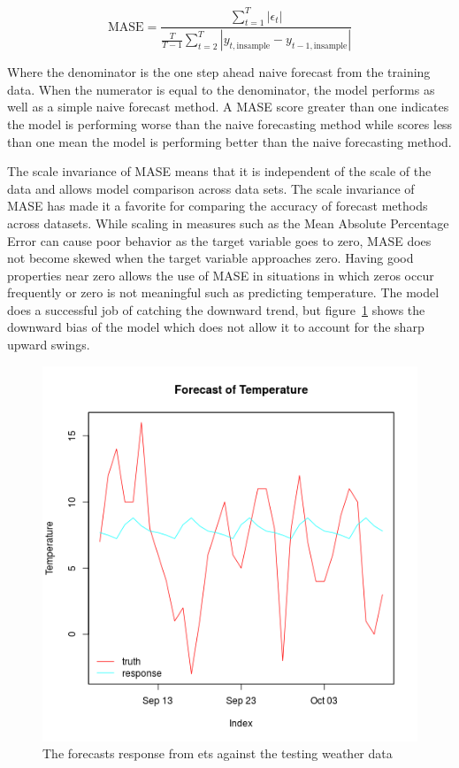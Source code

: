 \documentclass[12pt]{article}\usepackage[]{graphicx}\usepackage[]{color}
\theoremstyle{definition}
\begin{document}
\begin{equation}
\text{MASE} = \frac{\sum_{t=1}^T |\epsilon_t|}{\frac{T}{T-1} \sum_{t=2}^T |y_{t, \text{insample}} - y_{t-1, \text{insample}}|}
\end{equation}

Where the denominator is the one step ahead naive forecast from the training data. When the numerator is equal to the denominator, the model performs as well as a simple naive forecast method. A MASE score greater than one indicates the model is performing worse than the naive forecasting method while scores less than one mean the model is performing better than the naive forecasting method.

The scale invariance of MASE means that it is independent of the scale of the data and allows model comparison across data sets. The scale invariance of MASE has made it a favorite for comparing the accuracy of forecast methods~\cite{noteMase} across datasets. While scaling in measures such as the Mean Absolute Percentage Error can cause poor behavior as the target variable goes to zero, MASE does not become skewed when the target variable approaches zero. Having good properties near zero allows the use of MASE in situations in which zeros occur frequently or zero is not meaningful such as predicting temperature. The model does a successful job of catching the downward trend, but figure~\ref{fig:ets_train} shows the downward bias of the model which does not allow it to account for the sharp upward swings.

\singlespacing


\doublespacing

\begin{figure}[h!]
\includegraphics[width=\linewidth]{plot_ets_train.png}
\centering
\caption{The forecasts response from ets against the testing weather data}
\label{fig:ets_train}
\end{figure}
\end{document}
